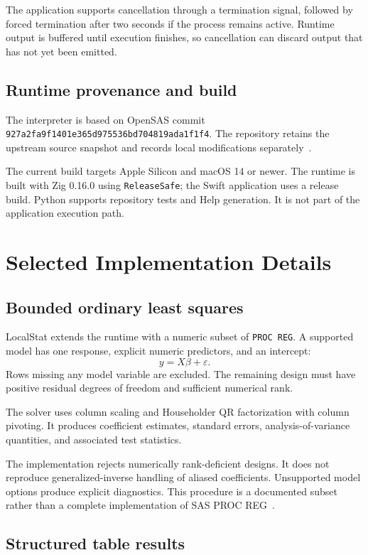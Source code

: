 \documentclass[11pt,a4paper]{article}
\begin{document}
The application supports cancellation through a termination
signal, followed by forced termination after two seconds if the
process remains active. Runtime output is buffered until
execution finishes, so cancellation can discard output that has
not yet been emitted.

\subsection{Runtime provenance and build}

The interpreter is based on OpenSAS commit
\texttt{927a2fa9f1401e365d975536bd704819ada1f1f4}.
The repository retains the upstream source snapshot and records
local modifications separately~\cite{runtimechanges}.

The current build targets Apple Silicon and macOS 14 or newer.
The runtime is built with Zig 0.16.0 using
\texttt{ReleaseSafe}; the Swift application uses a release build.
Python supports repository tests and Help generation. It is not
part of the application execution path.

\section{Selected Implementation Details}

\subsection{Bounded ordinary least squares}

LocalStat extends the runtime with a numeric subset of
\texttt{PROC REG}. A supported model has one response, explicit
numeric predictors, and an intercept:
\[
    y = X\beta + \varepsilon.
\]
Rows missing any model variable are excluded. The remaining
design must have positive residual degrees of freedom and
sufficient numerical rank.

The solver uses column scaling and Householder QR factorization
with column pivoting. It produces coefficient estimates,
standard errors, analysis-of-variance quantities, and associated
test statistics.

The implementation rejects numerically rank-deficient designs.
It does not reproduce generalized-inverse handling of aliased
coefficients. Unsupported model options produce explicit
diagnostics. This procedure is a documented subset rather than
a complete implementation of SAS PROC REG~\cite{compatibility}.

\subsection{Structured table results}
\end{document}
